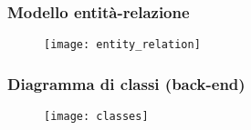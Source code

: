 \documentclass{beamer}
\begin{document}
\begin{frame}
  \frametitle{Modello entità-relazione}
  \begin{figure}
    \texttt{[image: entity\_relation]}
  \end{figure}
\end{frame}

\begin{frame}
  \frametitle{Diagramma di classi (back-end)}
  \begin{figure}
    \texttt{[image: classes]}
  \end{figure}
\end{frame}
\end{document}
